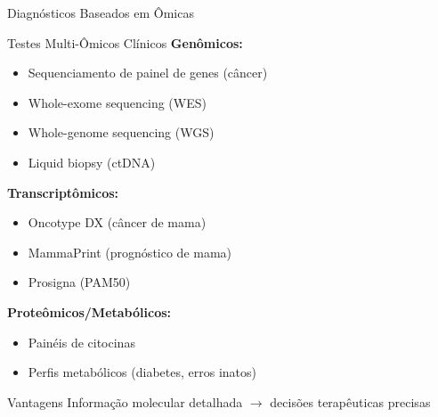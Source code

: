 \begin{frame}{Diagnósticos Baseados em Ômicas}
\begin{block}{Testes Multi-Ômicos Clínicos}
\textbf{Genômicos:}
\begin{itemize}
    \item Sequenciamento de painel de genes (câncer)
    \item Whole-exome sequencing (WES)
    \item Whole-genome sequencing (WGS)
    \item Liquid biopsy (ctDNA)
\end{itemize}

\textbf{Transcriptômicos:}
\begin{itemize}
    \item Oncotype DX (câncer de mama)
    \item MammaPrint (prognóstico de mama)
    \item Prosigna (PAM50)
\end{itemize}

\textbf{Proteômicos/Metabólicos:}
\begin{itemize}
    \item Painéis de citocinas
    \item Perfis metabólicos (diabetes, erros inatos)
\end{itemize}
\end{block}

\vspace{0.3cm}

\begin{exampleblock}{Vantagens}
Informação molecular detalhada $\rightarrow$ decisões terapêuticas precisas
\end{exampleblock}
\end{frame}

